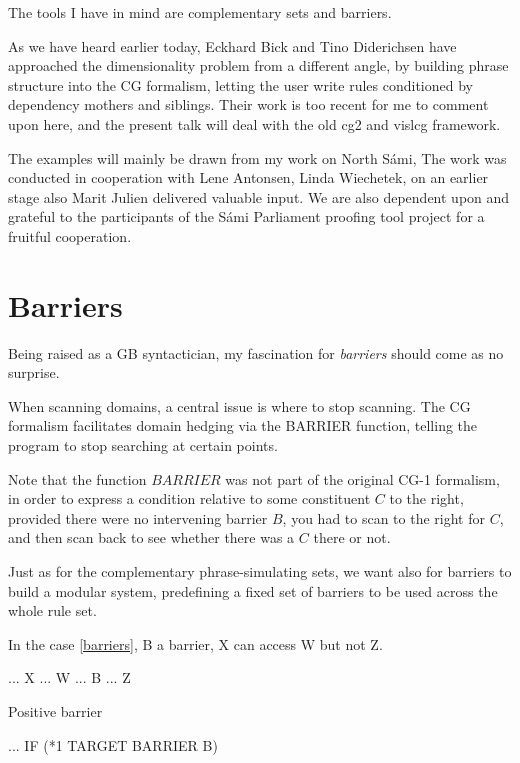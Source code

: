 \documentclass[a4paper,english]{article} %
\begin{document}
The tools I have in mind are complementary sets and barriers.%

As we have heard earlier today, Eckhard Bick and Tino Diderichsen have approached the dimensionality problem from a different angle, by building phrase structure into the CG formalism, letting the user write rules conditioned by dependency mothers and siblings. Their work is too recent for me to comment upon here, and the present talk will deal with the old cg2 and vislcg framework.%

The examples will mainly be drawn from my work on North Sámi, The work was conducted in cooperation with Lene Antonsen, Linda Wiechetek, on an earlier stage also Marit Julien delivered valuable input. We are also dependent upon and grateful to the participants of the Sámi Parliament proofing tool project for a fruitful cooperation.%



\section{Barriers}

Being raised as a GB syntactician, my fascination for \textit{barriers} should come as no surprise.%

When scanning domains, a central issue is where to stop scanning. The CG formalism facilitates domain hedging via the BARRIER function, telling the program to stop searching at certain points.%

Note that the function $BARRIER$ was not part of the original CG-1 formalism, in order to express a condition relative to some constituent $C$ to the right, provided there were no intervening barrier $B$, you had to scan to the right for $C$, and then scan back to see whether there was a $C$ there or not.%

Just as for the complementary phrase-simulating sets, we want also for barriers to build a modular system, predefining a fixed set of barriers to be used across the whole rule set.%

In the case \ref{barriers}, B a barrier, X can access W but not Z.%

\begin{example}\label{barriers}
... X ... W ... B ... Z 
\end{example}


\begin{example}\label{posi-barriers}
Positive barrier
\item[] ... IF (*1 TARGET BARRIER B)
\end{example}
\end{document}
